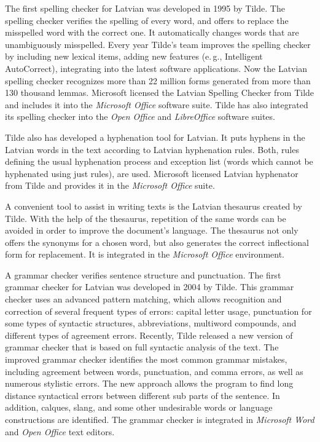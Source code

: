\begin{multicols}{2}
The first spelling checker for Latvian was developed in 1995 by Tilde.  The spelling checker verifies the spelling of every word, and offers to replace the misspelled word with the correct one.  It automatically changes words that are unambiguously misspelled.  Every year Tilde's team improves the spelling checker by including new lexical items, adding new features (e.\,g., Intelligent AutoCorrect), integrating into the latest software applications.  Now the Latvian spelling checker recognizes more than 22 million forms generated from more than 130 thousand lemmas.  Microsoft licensed the Latvian Spelling Checker from Tilde and includes it into the \textit{Microsoft Office} software suite.  Tilde has also integrated its spelling checker into the \textit{Open Office} and \textit{LibreOffice} software suites.

Tilde also has developed a hyphenation tool for Latvian.  It puts hyphens in the Latvian words in the text according to Latvian hyphenation rules.  Both, rules defining the usual hyphenation process and exception list (words which cannot be hyphenated using just rules), are used.  Microsoft licensed Latvian hyphenator from Tilde and provides it in the \textit{Microsoft Office} suite.

A convenient tool to assist in writing texts is the Latvian thesaurus created by Tilde.  With the help of the thesaurus, repetition of the same words can be avoided in order to improve the document's language.  The thesaurus not only offers the synonyms for a chosen word, but also generates the correct inflectional form for replacement.  It is integrated in the \textit{Microsoft Office} environment.

A grammar checker verifies sentence structure and punctuation.  The first grammar checker for Latvian was developed in 2004 by Tilde.  This grammar checker uses an advanced pattern matching, which allows recognition and correction of several frequent types of errors: capital letter usage, punctuation for some types of syntactic structures, abbreviations, multiword compounds, and different types of agreement errors.  Recently, Tilde released a new version of grammar checker that is based on full syntactic analysis of the text.  The improved grammar checker identifies the most common grammar mistakes, including agreement between words, punctuation, and comma errors, as well as numerous stylistic errors.  The new approach allows the program to find long distance syntactical errors between different sub parts of the sentence.  In addition, calques, slang, and some other undesirable words or language constructions are identified.  The grammar checker is integrated in \textit{Microsoft Word} and \textit{Open Office} text editors.


\end{multicols}
